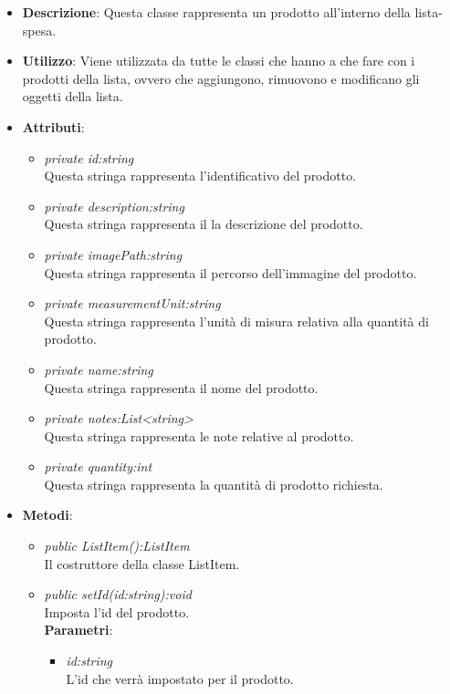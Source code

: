 \begin{itemize}
\item \textbf{Descrizione}: Questa classe rappresenta un prodotto all'interno della lista-spesa.
\item \textbf{Utilizzo}: Viene utilizzata da tutte le classi che hanno a che fare con i prodotti della lista, ovvero che aggiungono, rimuovono e modificano gli oggetti della lista.
\item \textbf{Attributi}: 
	\begin{itemize}
	\item \textit{private id:string}\\
		Questa stringa rappresenta l'identificativo del prodotto.
	\item \textit{private description:string}\\
	Questa stringa rappresenta il la descrizione del prodotto.
	\item \textit{private imagePath:string}\\
		Questa stringa rappresenta il percorso dell'immagine del prodotto.
	\item \textit{private measurementUnit:string}\\
	Questa stringa rappresenta l'unità di misura relativa alla quantità di prodotto.
	\item \textit{private name:string}\\
	Questa stringa rappresenta il nome del prodotto.
	\item \textit{private notes:List<string>}\\
	Questa stringa rappresenta le note relative al prodotto.
	\item \textit{private quantity:int}\\
	Questa stringa rappresenta la quantità di prodotto richiesta.
	\end{itemize}
\item \textbf{Metodi}:
	\begin{itemize}
	\item \textit{public ListItem():ListItem}\\
	Il costruttore della classe ListItem.
	\item \textit{public setId(id:string):void}\\
	Imposta l'id del prodotto.
				\\ \textbf{Parametri}: \begin{itemize}
				\item \textit{id:string}\\
						L'id che verrà impostato per il prodotto.

\end{itemize}
\end{itemize}
\end{itemize}

